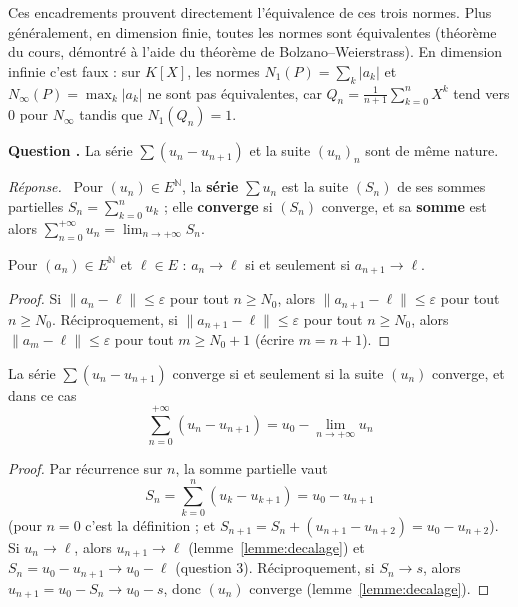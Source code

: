 \documentclass[11pt]{article}
\newcounter{qnum}
\newcommand{\question}[1]{%
\stepcounter{qnum}%
\bigskip
\noindent\textbf{Question \theqnum.} #1\par}
\newcommand{\reponse}{\noindent\textit{Réponse.}\ }
\begin{document}
\begin{remarque}
Ces encadrements prouvent directement l'équivalence de ces trois normes. Plus généralement, en dimension finie, toutes les normes sont équivalentes (théorème du cours, démontré à l'aide du théorème de Bolzano--Weierstrass). En dimension infinie c'est faux : sur $K[X]$, les normes $N_1(P)=\sum_k|a_k|$ et $N_\infty(P)=\max_k|a_k|$ ne sont pas équivalentes, car $Q_n=\frac{1}{n+1}\sum_{k=0}^nX^k$ tend vers $0$ pour $N_\infty$ tandis que $N_1(Q_n)=1$.
\end{remarque}

\question{La série $\sum(u_n-u_{n+1})$ et la suite $(u_n)_n$ sont de même nature.}
\reponse
Pour $(u_n)\in E^{\mathbb{N}}$, la \textbf{série} $\sum u_n$ est la suite $(S_n)$ de ses sommes partielles $S_n=\sum_{k=0}^nu_k$ ; elle \textbf{converge} si $(S_n)$ converge, et sa \textbf{somme} est alors $\sum_{n=0}^{+\infty}u_n=\lim_{n\to+\infty}S_n$.

\begin{lemme}
\label{lemme:decalage}
Pour $(a_n)\in E^{\mathbb{N}}$ et $\ell\in E$ : $a_n\to\ell$ si et seulement si $a_{n+1}\to\ell$.
\end{lemme}

\begin{proof}
Si $\|a_n-\ell\|\leq\varepsilon$ pour tout $n\geq N_0$, alors $\|a_{n+1}-\ell\|\leq\varepsilon$ pour tout $n\geq N_0$. Réciproquement, si $\|a_{n+1}-\ell\|\leq\varepsilon$ pour tout $n\geq N_0$, alors $\|a_m-\ell\|\leq\varepsilon$ pour tout $m\geq N_0+1$ (écrire $m=n+1$).
\end{proof}

\begin{prop}
\label{prop:telescopique}
La série $\sum(u_n-u_{n+1})$ converge si et seulement si la suite $(u_n)$ converge, et dans ce cas
\[\sum_{n=0}^{+\infty}(u_n-u_{n+1})=u_0-\lim_{n\to+\infty}u_n\]
\end{prop}

\begin{proof}
Par récurrence sur $n$, la somme partielle vaut
\[S_n=\sum_{k=0}^n(u_k-u_{k+1})=u_0-u_{n+1}\]
(pour $n=0$ c'est la définition ; et $S_{n+1}=S_n+(u_{n+1}-u_{n+2})=u_0-u_{n+2}$). Si $u_n\to\ell$, alors $u_{n+1}\to\ell$ (lemme~\ref{lemme:decalage}) et $S_n=u_0-u_{n+1}\to u_0-\ell$ (question 3). Réciproquement, si $S_n\to s$, alors $u_{n+1}=u_0-S_n\to u_0-s$, donc $(u_n)$ converge (lemme~\ref{lemme:decalage}).
\end{proof}
\end{document}
